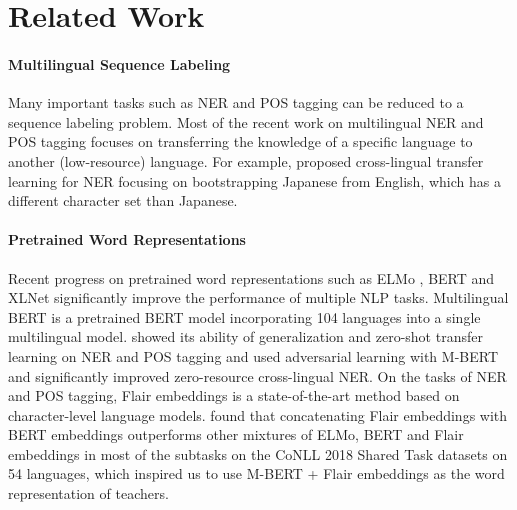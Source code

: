 \documentclass[11pt,a4paper]{article}
\begin{document}
\section{Related Work}
\paragraph{Multilingual Sequence Labeling} Many important tasks such as NER and POS tagging can be reduced to a sequence labeling problem. Most of the recent work on multilingual NER \cite{tackstrom-2012-nudging,fang-etal-2017-learning,enghoff-etal-2018-low,rahimi-etal-2019-massively,johnson-etal-2019-cross} and POS tagging \cite{snyder-etal-2009-adding,plank-agic-2018-distant} focuses on transferring the knowledge of a specific language to another (low-resource) language. For example, \citet{johnson-etal-2019-cross} proposed cross-lingual transfer learning for NER focusing on bootstrapping Japanese from English, which has a different character set than Japanese.

\paragraph{Pretrained Word Representations}
Recent progress on pretrained word representations such as ELMo \cite{peters-etal-2018-deep}, BERT \cite{devlin-etal-2019-bert} and XLNet \cite{NIPS2019_8812} significantly improve the performance of multiple NLP tasks. Multilingual BERT is a pretrained BERT model incorporating 104 languages into a single multilingual model. \citet{pires-etal-2019-multilingual} showed its ability of generalization and zero-shot transfer learning on NER and POS tagging and \citet{keung-etal-2019-adversarial} used adversarial learning with M-BERT and significantly improved zero-resource cross-lingual NER. On the tasks of NER and POS tagging, Flair embeddings \cite{akbik-etal-2018-contextual,akbik-etal-2019-pooled} is a state-of-the-art method based on character-level language models. \citet{straka2019evaluating} found that concatenating Flair embeddings with BERT embeddings outperforms other mixtures of ELMo, BERT and Flair embeddings in most of the subtasks on the CoNLL 2018 Shared Task \cite{zeman-shared-2018-conll} datasets on 54 languages, which inspired us to use M-BERT + Flair embeddings as the word representation of teachers.
\end{document}
